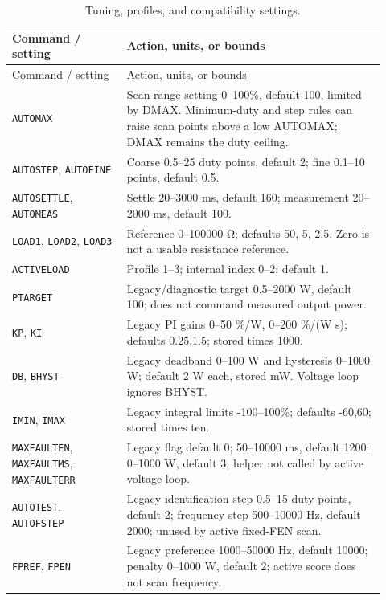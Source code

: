 \endgroup
\begingroup
\small
\begin{longtable}{@{}L{0.29\linewidth}L{0.63\linewidth}@{}}
\caption{Tuning, profiles, and compatibility settings.}\label{tab:app-fw-tune-settings}\\
\toprule Command / setting & Action, units, or bounds\\\midrule
\endfirsthead
\toprule Command / setting & Action, units, or bounds\\\midrule
\endhead
\texttt{AUTOMAX} & Scan-range setting 0--100\%, default 100, limited by DMAX. Minimum-duty and step rules can raise scan points above a low AUTOMAX; DMAX remains the duty ceiling.\\
\texttt{AUTOSTEP}, \texttt{AUTOFINE} & Coarse 0.5--25 duty points, default 2; fine 0.1--10 points, default 0.5.\\
\texttt{AUTOSETTLE}, \texttt{AUTOMEAS} & Settle 20--3000 ms, default 160; measurement 20--2000 ms, default 100.\\
\texttt{LOAD1}, \texttt{LOAD2}, \texttt{LOAD3} & Reference 0--100000 \si{\ohm}; defaults 50, 5, 2.5. Zero is not a usable resistance reference.\\
\texttt{ACTIVELOAD} & Profile 1--3; internal index 0--2; default 1.\\
\texttt{PTARGET} & Legacy/diagnostic target 0.5--2000 W, default 100; does not command measured output power.\\
\texttt{KP}, \texttt{KI} & Legacy PI gains 0--50 \%/W, 0--200 \%/(W s); defaults 0.25,1.5; stored times 1000.\\
\texttt{DB}, \texttt{BHYST} & Legacy deadband 0--100 W and hysteresis 0--1000 W; default 2 W each, stored mW. Voltage loop ignores BHYST.\\
\texttt{IMIN}, \texttt{IMAX} & Legacy integral limits -100--100\%; defaults -60,60; stored times ten.\\
\texttt{MAXFAULTEN}, \texttt{MAXFAULTMS}, \texttt{MAXFAULTERR} & Legacy flag default 0; 50--10000 ms, default 1200; 0--1000 W, default 3; helper not called by active voltage loop.\\
\texttt{AUTOTEST}, \texttt{AUTOFSTEP} & Legacy identification step 0.5--15 duty points, default 2; frequency step 500--10000 Hz, default 2000; unused by active fixed-FEN scan.\\
\texttt{FPREF}, \texttt{FPEN} & Legacy preference 1000--50000 Hz, default 10000; penalty 0--1000 W, default 2; active score does not scan frequency.\\
\bottomrule
\end{longtable}
\endgroup

